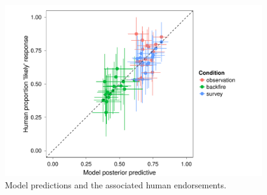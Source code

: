 \documentclass[10pt,letterpaper]{article}
\newcommand{\red}[1]{\textcolor{Red}{#1}}
\begin{document}
\begin{figure}
    \includegraphics[width=\columnwidth]{scatter}
    \caption{Model predictions and the associated human endorsements.}
  \label{fig:scatter}
\end{figure}



\end{document}
